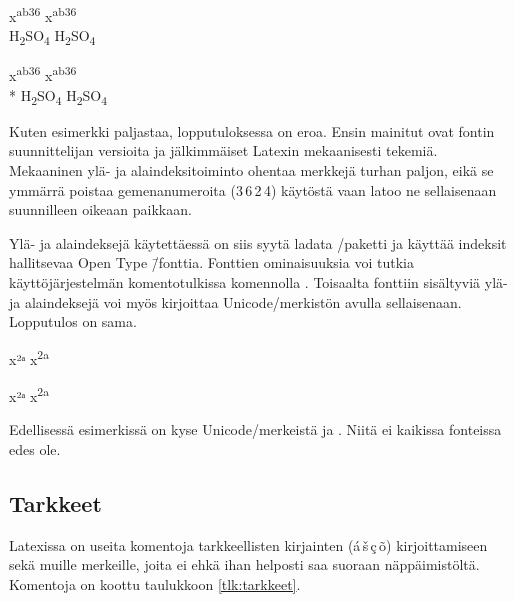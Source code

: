 \pagebreak[3]

\begin{koodilohkosis}
  x\textsuperscript {ab36}
  x\textsuperscript*{ab36} \\
  H\textsubscript {2}SO\textsubscript {4}
  H\textsubscript*{2}SO\textsubscript*{4}
\end{koodilohkosis}

\begin{tulossis}
  x\textsuperscript {ab36}
  x\textsuperscript*{ab36} \\*
  H\textsubscript {2}SO\textsubscript {4}
  H\textsubscript*{2}SO\textsubscript*{4}
\end{tulossis}

Kuten esimerkki paljastaa, lopputuloksessa on eroa. Ensin mainitut ovat
fontin suunnittelijan versioita ja jälkimmäiset Latexin mekaanisesti
tekemiä. Mekaaninen ylä- ja ala\-in\-dek\-si\-toi\-min\-to ohentaa
merkkejä turhan paljon, eikä se ymmärrä poistaa gemenanumeroita
(3\,6\,2\,4) käytöstä vaan latoo ne sellaisenaan suunnilleen oikeaan
paikkaan.

Ylä- ja alaindeksejä käytettäessä on siis syytä ladata
\-/paketti ja käyttää indeksit hallitsevaa Open
Type \=/fonttia. Fonttien ominaisuuksia voi tutkia käyttöjärjestelmän
komentotulkissa komennolla . Toisaalta fonttiin
sisältyviä ylä- ja alaindeksejä voi myös kirjoittaa Unicode\-/merkistön
avulla sellaisenaan. Lopputulos on sama.

\pagebreak[3]

\begin{koodilohkosis}
  x²ᵃ x\textsuperscript{2a}
\end{koodilohkosis}

\begin{tulossis}
  x²ᵃ x\textsuperscript{2a}
\end{tulossis}

Edellisessä esimerkissä on kyse Unicode\-/merkeistä  ja . Niitä
ei kaikissa fonteissa edes ole.

\subsection{Tarkkeet}

Latexissa on useita komentoja tarkkeellisten kirjainten
(\'a\,\v{s}\,\c{c}\,\~o) kirjoittamiseen sekä muille merkeille, joita ei
ehkä ihan helposti saa suoraan näppäimistöltä. Komentoja on koottu
taulukkoon \ref{tlk:tarkkeet}.

